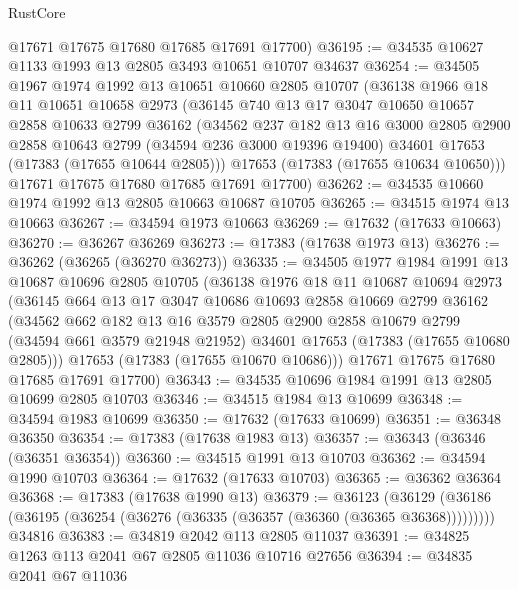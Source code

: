 \begin{lexlean}{RustCore}
\begin{coremodule}
      @17671
      @17675
      @17680
      @17685
      @17691
      @17700)
@36195 := @34535 @10627 @1133 @1993 @13 @2805 @3493 @10651 @10707 @34637
@36254 := @34505
    @1967
    @1974
    @1992
    @13
    @10651
    @10660
    @2805
    @10707
    (@36138
      @1966
      @18
      @11
      @10651
      @10658
      @2973
      (@36145
        @740
        @13
        @17
        @3047
        @10650
        @10657
        @2858
        @10633
        @2799
        @36162
        (@34562
          @237
          @182
          @13
          @16
          @3000
          @2805
          @2900
          @2858
          @10643
          @2799
          (@34594 @236 @3000 @19396 @19400)
          @34601
          @17653
          (@17383 (@17655 @10644 @2805)))
        @17653
        (@17383 (@17655 @10634 @10650)))
      @17671
      @17675
      @17680
      @17685
      @17691
      @17700)
@36262 := @34535 @10660 @1974 @1992 @13 @2805 @10663 @10687 @10705
@36265 := @34515 @1974 @13 @10663
@36267 := @34594 @1973 @10663
@36269 := @17632 (@17633 @10663)
@36270 := @36267 @36269
@36273 := @17383 (@17638 @1973 @13)
@36276 := @36262 (@36265 (@36270 @36273))
@36335 := @34505
    @1977
    @1984
    @1991
    @13
    @10687
    @10696
    @2805
    @10705
    (@36138
      @1976
      @18
      @11
      @10687
      @10694
      @2973
      (@36145
        @664
        @13
        @17
        @3047
        @10686
        @10693
        @2858
        @10669
        @2799
        @36162
        (@34562
          @662
          @182
          @13
          @16
          @3579
          @2805
          @2900
          @2858
          @10679
          @2799
          (@34594 @661 @3579 @21948 @21952)
          @34601
          @17653
          (@17383 (@17655 @10680 @2805)))
        @17653
        (@17383 (@17655 @10670 @10686)))
      @17671
      @17675
      @17680
      @17685
      @17691
      @17700)
@36343 := @34535 @10696 @1984 @1991 @13 @2805 @10699 @2805 @10703
@36346 := @34515 @1984 @13 @10699
@36348 := @34594 @1983 @10699
@36350 := @17632 (@17633 @10699)
@36351 := @36348 @36350
@36354 := @17383 (@17638 @1983 @13)
@36357 := @36343 (@36346 (@36351 @36354))
@36360 := @34515 @1991 @13 @10703
@36362 := @34594 @1990 @10703
@36364 := @17632 (@17633 @10703)
@36365 := @36362 @36364
@36368 := @17383 (@17638 @1990 @13)
@36379 := @36123
    (@36129 (@36186 (@36195 (@36254 (@36276 (@36335 (@36357 (@36360 (@36365 @36368)))))))))
    @34816
@36383 := @34819 @2042 @113 @2805 @11037
@36391 := @34825 @1263 @113 @2041 @67 @2805 @11036 @10716 @27656
@36394 := @34835 @2041 @67 @11036

\end{coremodule}
\end{lexlean}
